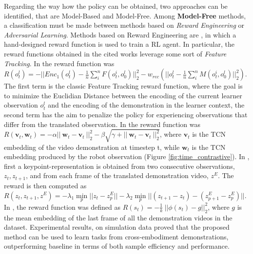 Regarding the way how the policy can be obtained, two approaches can be identified, that are Model-Based and Model-Free. 
\newline Among \textbf{Model-Free} methods, a classification must be made between methods based on \textit{Reward Engineering} or \textit{Adversarial Learning}.
\newline Methods based on Reward Engineering are \cite{sermanet2018time_contrastive,xiong2021learning_by_watching,zakka2022xirl}, in which a hand-designed reward function is used to train a RL agent. In particular, the reward functions obtained in the cited works leverage some sort of \textit{Feature Tracking}. In \cite{sermanet2018time_contrastive} the reward function was $R(o^{l}_{t}) = -||Enc_{1}(o^{l}_{t}) - \frac{1}{n} \sum_{i}^{n}F(o_{t}^{i},o_{0}^{l})||^{2}_{2} - w_{rec} (||o^{l}_{t} - \frac{1}{n} \sum_{i}^{n}M(o_{t}^{i},o_{0}^{l})||^{2}_{2})$. The first term is the classic Feature Tracking reward function, where the goal is to minimize the Euclidian Distance between the encoding of the current learner observation $o^{l}_{t}$ and the encoding of the demonstration in the learner context, the second term has the aim to penalize the policy for experiencing observations that differ from the translated observation.
In \cite{sermanet2018time_contrastive} the reward function was $R(\textbf{v}_{t}, \textbf{w}_{t}) = - \alpha || \ \textbf{w}_{t} - \textbf{v}_{t} \ ||^{2}_{2} - \beta \sqrt{\gamma + || \ \textbf{w}_{t} - \textbf{v}_{t} \ ||^{2}_{2}}$, where $\textbf{v}_{t}$ is the TCN embedding of the video demonstration at timestep t, while $\textbf{w}_{t}$ is the TCN embedding produced by the robot observation (Figure \ref{fig:time_contrastive}).
In \cite{xiong2021learning_by_watching}, first a keypoint-representation is obtained from two consecutive observations, $z_{t}, z_{t+1}$, and from each frame of the translated demonstration video, $z^{E}$. The reward is then computed as $R(z_{t},z_{t+1},z^{E}) = - \lambda_{1} \underset{p}{\min} ||z_{t}-z^{E}_{p}|| - \lambda_{2} \underset{p}{\min} ||(z_{t+1}-z_{t}) - (z^{E}_{p+1}-z^{E}_{p})||$. %
In \cite{zakka2022xirl}, the reward function was defined as $R(s_{t}) = -\frac{1}{k} \ || \phi(s_{t}) - g||^{2}_{2}$, where $g$ is the mean embedding of the last frame of all the demonstration videos in the dataset. Experimental results, on simulation data proved that the proposed method can be used to learn tasks from cross-embodiment demonstrations, outperforming baseline \cite{sermanet2018time_contrastive} in terms of both sample efficiency and performance.%
